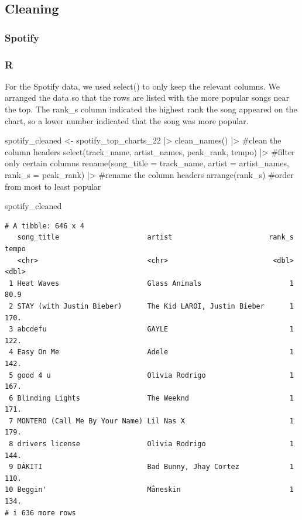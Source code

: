 \documentclass[
  letterpaper,
  DIV=11,
  numbers=noendperiod]{scrreprt}
\newenvironment{Shaded}{\begin{snugshade}}{\end{snugshade}}
\newcommand{\AttributeTok}[1]{\textcolor[rgb]{0.40,0.45,0.13}{#1}}
\newcommand{\CommentTok}[1]{\textcolor[rgb]{0.37,0.37,0.37}{#1}}
\newcommand{\FunctionTok}[1]{\textcolor[rgb]{0.28,0.35,0.67}{#1}}
\newcommand{\NormalTok}[1]{\textcolor[rgb]{0.00,0.23,0.31}{#1}}
\newcommand{\OtherTok}[1]{\textcolor[rgb]{0.00,0.23,0.31}{#1}}
\newcommand{\SpecialCharTok}[1]{\textcolor[rgb]{0.37,0.37,0.37}{#1}}
\begin{document}
\subsection*{Cleaning}\label{cleaning-1}

\subsubsection*{Spotify}\label{spotify}

\subsubsection{R}

For the Spotify data, we used select() to only keep the relevant
columns. We arranged the data so that the rows are listed with the more
popular songs near the top. The rank\_s column indicated the highest
rank the song appeared on the chart, so a lower number indicated that
the song was more popular.

\begin{Shaded}
\begin{Highlighting}[]
\NormalTok{spotify\_cleaned }\OtherTok{\textless{}{-}}\NormalTok{ spotify\_top\_charts\_22 }\SpecialCharTok{|\textgreater{}} 
  \FunctionTok{clean\_names}\NormalTok{() }\SpecialCharTok{|\textgreater{}} \CommentTok{\#clean the column headers}
  \FunctionTok{select}\NormalTok{(track\_name, artist\_names, peak\_rank, tempo) }\SpecialCharTok{|\textgreater{}} \CommentTok{\#filter only certain columns}
  \FunctionTok{rename}\NormalTok{(}\AttributeTok{song\_title =}\NormalTok{ track\_name, }\AttributeTok{artist =}\NormalTok{ artist\_names, }\AttributeTok{rank\_s =}\NormalTok{ peak\_rank) }\SpecialCharTok{|\textgreater{}} \CommentTok{\#rename the column headers}
  \FunctionTok{arrange}\NormalTok{(rank\_s) }\CommentTok{\#order from most to least popular}

\NormalTok{spotify\_cleaned}
\end{Highlighting}
\end{Shaded}

\begin{verbatim}
# A tibble: 646 x 4
   song_title                     artist                       rank_s tempo
   <chr>                          <chr>                         <dbl> <dbl>
 1 Heat Waves                     Glass Animals                     1  80.9
 2 STAY (with Justin Bieber)      The Kid LAROI, Justin Bieber      1 170. 
 3 abcdefu                        GAYLE                             1 122. 
 4 Easy On Me                     Adele                             1 142. 
 5 good 4 u                       Olivia Rodrigo                    1 167. 
 6 Blinding Lights                The Weeknd                        1 171. 
 7 MONTERO (Call Me By Your Name) Lil Nas X                         1 179. 
 8 drivers license                Olivia Rodrigo                    1 144. 
 9 DÁKITI                         Bad Bunny, Jhay Cortez            1 110. 
10 Beggin'                        Måneskin                          1 134. 
# i 636 more rows
\end{verbatim}
\end{document}
